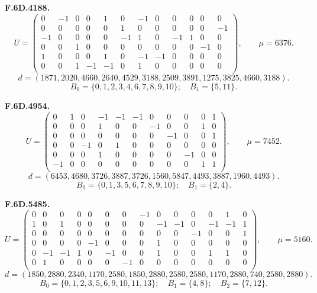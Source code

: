 \par\medskip\noindent\begin{minipage}{\linewidth}\textbf{F.6D.4188.}
\begingroup\small\setlength{\arraycolsep}{3pt}
\[U=\begin{pmatrix}
0 & -1 & 0 & 0 & 1 & 0 & -1 & 0 & 0 & 0 & 0 & 0\\
0 & 0 & 0 & 0 & 0 & 1 & 0 & 0 & 0 & 0 & 0 & -1\\
-1 & 0 & 0 & 0 & 0 & -1 & 1 & 0 & -1 & 1 & 0 & 0\\
0 & 0 & 1 & 0 & 0 & 0 & 0 & 0 & 0 & 0 & -1 & 0\\
1 & 0 & 0 & 0 & 1 & 0 & -1 & -1 & 0 & 0 & 0 & 0\\
0 & 0 & 1 & -1 & -1 & 0 & 1 & 0 & 0 & 0 & 0 & 0\\
\end{pmatrix},\qquad \mu=6376.\]
\[d=(1871,2020,4660,2640,4529,3188,2509,3891,1275,3825,4660,3188).\]
\[B_0=\{0,1,2,3,4,6,7,8,9,10\};\quad B_1=\{5,11\}.\]
\endgroup\end{minipage}\par
\par\medskip\noindent\begin{minipage}{\linewidth}\textbf{F.6D.4954.}
\begingroup\small\setlength{\arraycolsep}{3pt}
\[U=\begin{pmatrix}
0 & 1 & 0 & -1 & -1 & -1 & 0 & 0 & 0 & 0 & 1\\
0 & 0 & 0 & 1 & 0 & 0 & -1 & 0 & 0 & 1 & 0\\
0 & 0 & 0 & 0 & 0 & 0 & 0 & -1 & 0 & 0 & 1\\
0 & 0 & -1 & 0 & 1 & 0 & 0 & 0 & 0 & 0 & 0\\
0 & 0 & 0 & 1 & 0 & 0 & 0 & 0 & -1 & 0 & 0\\
-1 & 0 & 0 & 0 & 0 & 0 & 0 & 0 & 0 & 1 & 1\\
\end{pmatrix},\qquad \mu=7452.\]
\[d=(6453,4680,3726,3887,3726,1560,5847,4493,3887,1960,4493).\]
\[B_0=\{0,1,3,5,6,7,8,9,10\};\quad B_1=\{2,4\}.\]
\endgroup\end{minipage}\par
\par\medskip\noindent\begin{minipage}{\linewidth}\textbf{F.6D.5485.}
\begingroup\small\setlength{\arraycolsep}{3pt}
\[U=\begin{pmatrix}
0 & 0 & 0 & 0 & 0 & 0 & 0 & -1 & 0 & 0 & 0 & 0 & 1 & 0\\
1 & 0 & 1 & 0 & 0 & 0 & 0 & 0 & -1 & -1 & 0 & -1 & -1 & 1\\
0 & 0 & 0 & 0 & 0 & 0 & 0 & 0 & 0 & 0 & -1 & 0 & 0 & 1\\
0 & 0 & 0 & 0 & -1 & 0 & 0 & 0 & 1 & 0 & 0 & 0 & 0 & 0\\
0 & -1 & -1 & 1 & 0 & -1 & 0 & 0 & 1 & 0 & 0 & 1 & 1 & 0\\
0 & 1 & 0 & 0 & 0 & 0 & -1 & 0 & 0 & 0 & 0 & 0 & 0 & 0\\
\end{pmatrix},\qquad \mu=5160.\]
\[d=(1850,2880,2340,1170,2580,1850,2880,2580,2580,1170,2880,740,2580,2880).\]
\[B_0=\{0,1,2,3,5,6,9,10,11,13\};\quad B_1=\{4,8\};\quad B_2=\{7,12\}.\]
\endgroup\end{minipage}\par
